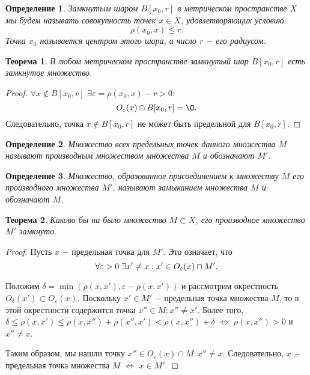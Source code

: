 \documentclass{article}
\newtheorem{theorem}{Теорема}[section]
\newtheorem{definition}{Определение}[section]
\begin{document}
\begin{definition}
Замкнутым шаром \(B[x_0, r]\) в метрическом пространстве \(X\) мы будем называть совокупность точек \(x \in X\), удовлетворяющих условию
\[
\rho(x_0, x) \leq r.
\]
Точка \(x_0\) называется центром этого шара, а число \(r\) \(-\) его радиусом.
\end{definition}

\begin{theorem}
В любом метрическом пространстве замкнутый шар \(B[x_0, r]\) есть замкнутое множество.
\end{theorem}

\begin{proof}
\(\forall x \notin B[x_0, r]\) \(\exists \varepsilon = \rho(x_0, x) - r > 0 :\)
\[
O_\varepsilon(x) \cap B[x_0, r] = \O.
\]
Следовательно, точка \(x \notin B[x_0, r]\) не может быть предельной для \(B[x_0, r]\).
\end{proof}

\begin{definition}
Множество всех предельных точек данного множества \(M\) называют производным множеством множества \(M\) и обозначают \(M'\).
\end{definition}

\begin{definition}
Множество, образованное присоединением к множеству \(M\) его производного множества \(M'\), называют замыканием множества \(M\) и обозначают \(\overline{M}\).
\end{definition}

\begin{theorem}
Каково бы ни было множество \(M \subset X\), его производное множество \(M'\) замкнуто.
\end{theorem}

\begin{proof}
Пусть \(x\) \(-\) предельная точка для \(M'\). Это означает, что
\[
\forall \varepsilon > 0 \hspace{1mm} \exists x' \neq x : x' \in O_\varepsilon(x) \cap M'.
\]

Положим \(\delta = \min(\rho(x, x'), \varepsilon - \rho(x, x'))\) и рассмотрим окрестность \(O_\delta(x') \subset O_\varepsilon(x)\). Поскольку \(x' \in M'\) \(-\) предельная точка множества \(M\), то в этой окрестности содержится точка \(x'' \in M : x'' \neq x'\). Более того, \(\delta \leq \rho(x, x') \leq \rho(x, x'') + \rho(x'', x') < \rho(x, x'') + \delta\) \(\Leftrightarrow\) \(\rho(x, x'') > 0\) и \(x'' \neq x\).

Таким образом, мы нашли точку \(x'' \in O_\varepsilon(x) \cap M : x'' \neq x\). Следовательно, \(x\) \(-\) предельная точка множества \(M\) \(\Leftrightarrow\) \(x \in M'\).
\end{proof}
\end{document}
